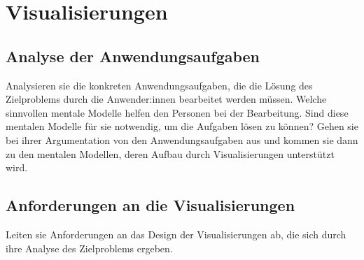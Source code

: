 \documentclass[usegeometry=true]{scrartcl}
\begin{document}

\section{Visualisierungen}
\subsection{Analyse der Anwendungsaufgaben}
Analysieren sie die konkreten Anwendungsaufgaben, die die Lösung des Zielproblems durch die Anwender:innen bearbeitet werden müssen. 
Welche sinnvollen mentale Modelle helfen den Personen bei der Bearbeitung. 
Sind diese mentalen Modelle für sie notwendig, um die Aufgaben lösen zu können? Gehen sie bei ihrer Argumentation von den Anwendungsaufgaben aus und kommen sie dann zu den mentalen Modellen, deren Aufbau durch Visualisierungen unterstützt wird. 
\subsection{Anforderungen an die Visualisierungen}
Leiten sie Anforderungen an das Design der Visualisierungen ab, die sich durch ihre Analyse des Zielproblems ergeben.
\end{document}
